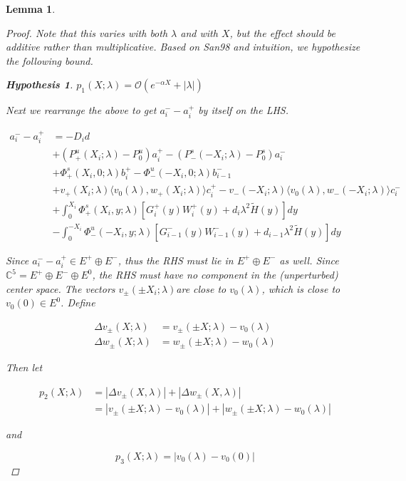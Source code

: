 \documentclass[12pt]{article}
\def\C{{\mathbb C}}
\newtheorem{lemma}{Lemma}
\newtheorem{hypothesis}{Hypothesis}
\begin{document}
\begin{lemma}
\begin{proof}
Note that this varies with both $\lambda$ and with $X$, but the effect should be additive rather than multiplicative. Based on San98 and intuition, we hypothesize the following bound.

\begin{hypothesis}
$ p_1(X;\lambda) = \mathcal{O}( e^{-\alpha X} + |\lambda| )$
\end{hypothesis}

Next we rearrange the above to get $a_i^- - a_i^+$ by itself on the LHS.

\begin{align*}
a_i^- - a_i^+ &= -D_i d  \\
&+ (P^u_+(X_i; \lambda) - P_0^u)a_i^+ - (P^s_-(-X_i; \lambda) - P_0^s)a_i^- \\
&+ \Phi^s_+(X_i, 0; \lambda)b_i^+ - \Phi^u_-(-X_i, 0; \lambda)b_{i-1}^- \\
&+ v_+(X_i; \lambda) \langle v_0(\lambda), w_+(X_i; \lambda) \rangle c_i^+ - v_-(-X_i; \lambda) \langle v_0(\lambda), w_-(-X_i; \lambda) \rangle c_i^- \\
&+ \int_0^{X_i} \Phi^s_+(X_i, y; \lambda) [ G_i^+(y) W_i^+(y) + d_i \lambda^2 \tilde{H}(y) ] dy \\
&- \int_0^{-X_i} \Phi^u_-(-X_i, y; \lambda) [ G_{i-1}^-(y) W_{i-1}^-(y) + d_{i-1} \lambda^2 \tilde{H}(y) ] dy
\end{align*}

Since $a_i^- - a_i^+ \in E^+ \oplus E^-$, thus the RHS must lie in $E^+ \oplus E^-$ as well. Since $\C^5 = E^+ \oplus E^- \oplus E^0$, the RHS must have no component in the (unperturbed) center space. The vectors $v_\pm(\pm X_i; \lambda)$are close to $v_0(\lambda)$, which is close to $v_0(0) \in E^0$. Define

\begin{align*}
\Delta v_\pm(X; \lambda) &= v_\pm(\pm X; \lambda) - v_0(\lambda) \\
\Delta w_\pm(X; \lambda) &= w_\pm(\pm X; \lambda) - w_0(\lambda)
\end{align*}

Then let

\begin{align*}
p_2(X; \lambda) &= |\Delta v_\pm(X, \lambda)| + |\Delta w_\pm(X, \lambda)|\\
&= |v_\pm(\pm X; \lambda) - v_0(\lambda)| + |w_\pm(\pm X; \lambda) - w_0(\lambda)|
\end{align*}

and

\begin{equation}\label{p3}
p_3(X; \lambda) = |v_0(\lambda) - v_0(0)| 
\end{equation}


\end{proof}
\end{lemma}
\end{document}
